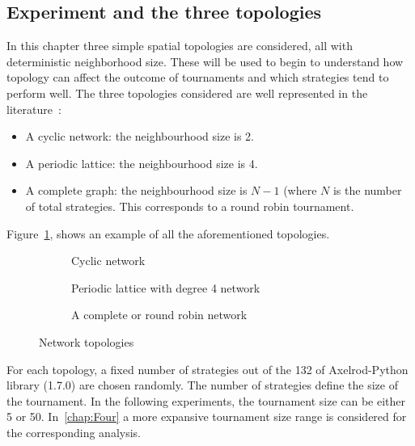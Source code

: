 \subsection{Experiment and the three topologies}
In this chapter three simple spatial topologies are considered, all with
deterministic neighborhood size. These will be used to begin to understand how
topology can affect the outcome of tournaments
and which strategies tend to perform well. The three topologies considered are
well represented in the literature~\cite{Axelrod1980a,Szabo2007,Lutz2013}:
\begin{itemize}
	\item A cyclic network: the neighbourhood size is 2.~\cite{Szabo2007}
	\item A periodic lattice: the neighbourhood size is 4.~\cite{Lutz2013}
	\item A complete graph: the neighbourhood size is \(N-1\) (where \(N\) is
	      the number of total strategies. This corresponds to a round robin
	      tournament.~\cite{Axelrod1980a}
\end{itemize}

Figure~\ref{fig:networks}, shows an example of all the aforementioned topologies.

\begin{figure}[!hbtp]
	\centering
	\begin{subfigure}[h]{0.45\textwidth}
		\centering
		
		\caption{Cyclic network}
	\end{subfigure}
	\hfill
	\begin{subfigure}[h]{0.52\textwidth}\centering
		\centering
		
		\caption{Periodic lattice with degree 4 network}
	\end{subfigure}
	\hfill
	\begin{subfigure}[h]{0.52\textwidth}\centering
		\centering
		
		\caption{A complete or round robin network}
	\end{subfigure}
	\caption{Network topologies}
	\label{fig:networks}
\end{figure}

For each topology, a fixed number of strategies out of the 132 of Axelrod-Python
library (1.7.0) are chosen randomly. The number of strategies define the size of the
tournament. In the following experiments, the tournament size can be either
5 or 50. In~\autoref{chap:Four} a more expansive tournament size range is
considered for the corresponding analysis.

